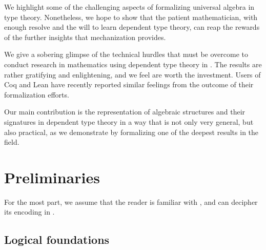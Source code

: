 We highlight some of the challenging aspects of formalizing universal algebra in type theory.
Nonetheless, we hope to show that the patient mathematician, with enough resolve and the will to learn
dependent type theory, can reap the rewards of the further insights that mechanization provides.

\ifshort\else
We give a sobering glimpse of the technical hurdles that must be overcome
to conduct research in mathematics using dependent type theory in \agda.
The results are rather gratifying and enlightening, and we feel are worth
the investment. Users of Coq and Lean have recently reported similar feelings
from the outcome of their formalization efforts.
\fi

Our main contribution is the representation of algebraic structures and their signatures
in dependent type theory in a way that is not only very general, but also practical, as we
demonstrate by formalizing one of the deepest results in the field.

\section{Preliminaries}

For the most part, we assume that the reader is familiar with \mltt, and can decipher its encoding in \agda.

\subsection{Logical foundations}


